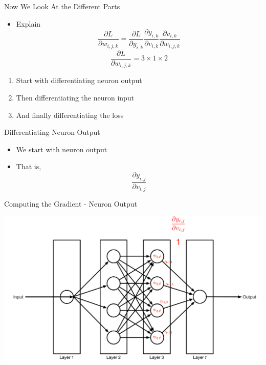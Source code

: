 \documentclass[aspectratio=169]{beamer}
\begin{document}
%
\begin{frame}{Now We Look At the Different Parts}

\begin{itemize} 
\item Explain
	$$ \frac{\partial L}{\partial w_{i,j,k}} = \frac{\partial L}{\partial y_{i,k}} 
						\frac{\partial y_{i,k}}{\partial v_{i,k}}
						\frac{\partial v_{i,k}}{\partial w_{i,j,k}}$$
	$$ \frac{\partial L}{\partial w_{i,j,k}} = 3 \times 1 \times 2 $$
\end{itemize}
\begin{enumerate} 
	\item Start with differentiating neuron output
	\item Then differentiating the neuron input
	\item And finally differentiating the loss
\end{enumerate}
\end{frame}
\begin{frame}{Differentiating Neuron Output}

\begin{itemize}
        \item We start with neuron output
	\item That is, $$\frac{\partial y_{i,j}}{\partial v_{i,j}}$$
\end{itemize}
\end{frame}
\begin{frame}{Computing the Gradient - Neuron Output}

\includegraphics[width=1\textwidth]{lectBP/nnbpStep1.pdf}
\end{frame}
\end{document}
